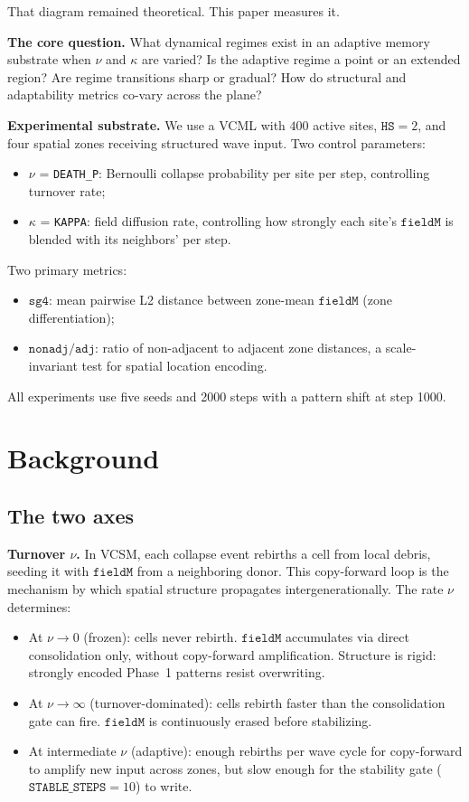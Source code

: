 \documentclass[11pt]{article}
\theoremstyle{remark}
\begin{document}
That diagram remained theoretical. This paper measures it.

\textbf{The core question.} What dynamical regimes exist in an adaptive memory
substrate when $\nu$ and $\kappa$ are varied? Is the adaptive regime a point or
an extended region? Are regime transitions sharp or gradual? How do structural
and adaptability metrics co-vary across the plane?

\textbf{Experimental substrate.} We use a VCML with $400$ active sites,
$\mathtt{HS}=2$, and four spatial zones receiving structured wave input. Two
control parameters:
\begin{itemize}
  \item $\nu$ = \texttt{DEATH\_P}: Bernoulli collapse probability per site per
    step, controlling turnover rate;
  \item $\kappa$ = \texttt{KAPPA}: field diffusion rate, controlling how strongly
    each site's $\mathtt{fieldM}$ is blended with its neighbors' per step.
\end{itemize}
Two primary metrics:
\begin{itemize}
  \item $\mathtt{sg4}$: mean pairwise L2 distance between zone-mean
    $\mathtt{fieldM}$ (zone differentiation);
  \item $\mathtt{nonadj/adj}$: ratio of non-adjacent to adjacent zone distances,
    a scale-invariant test for spatial location encoding.
\end{itemize}
All experiments use five seeds and 2000 steps with a pattern shift at step 1000.

\section{Background}

\subsection{The two axes}

\textbf{Turnover $\nu$.} In VCSM, each collapse event rebirths a cell from local
debris, seeding it with $\mathtt{fieldM}$ from a neighboring donor. This
copy-forward loop is the mechanism by which spatial structure propagates
intergenerationally. The rate $\nu$ determines:
\begin{itemize}
  \item At $\nu \to 0$ (frozen): cells never rebirth. $\mathtt{fieldM}$
    accumulates via direct consolidation only, without copy-forward amplification.
    Structure is rigid: strongly encoded Phase~1 patterns resist overwriting.
  \item At $\nu \to \infty$ (turnover-dominated): cells rebirth faster than the consolidation
    gate can fire. $\mathtt{fieldM}$ is continuously erased before stabilizing.
  \item At intermediate $\nu$ (adaptive): enough rebirths per wave cycle for
    copy-forward to amplify new input across zones, but slow enough for the
    stability gate ($\mathtt{STABLE\_STEPS} = 10$) to write.
\end{itemize}
\end{document}
